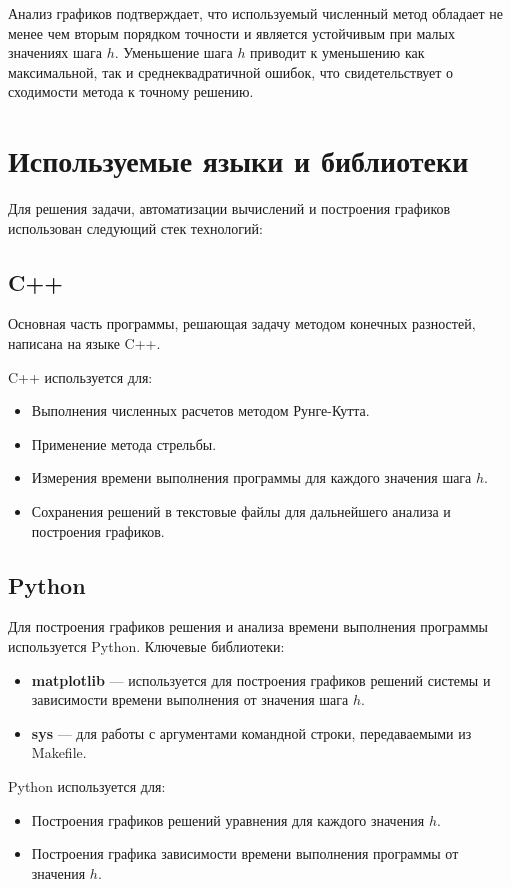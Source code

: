 \documentclass{article}
\begin{document}
Анализ графиков подтверждает, что используемый численный метод обладает не менее чем вторым порядком точности и является устойчивым при малых значениях шага \( h \). Уменьшение шага \( h \) приводит к уменьшению как максимальной, так и среднеквадратичной ошибок, что свидетельствует о сходимости метода к точному решению.


\section{Используемые языки и библиотеки}

Для решения задачи, автоматизации вычислений и построения графиков использован следующий стек технологий:

\subsection{C++}
Основная часть программы, решающая задачу методом конечных разностей, написана на языке C++. 

C++ используется для:
\begin{itemize}
    \item Выполнения численных расчетов методом Рунге-Кутта.
    \item Применение метода стрельбы.
    \item Измерения времени выполнения программы для каждого значения шага \( h \).
    \item Сохранения решений в текстовые файлы для дальнейшего анализа и построения графиков.
\end{itemize}

\subsection{Python}
Для построения графиков решения и анализа времени выполнения программы используется Python. Ключевые библиотеки:
\begin{itemize}
    \item \textbf{matplotlib} — используется для построения графиков решений системы и зависимости времени выполнения от значения шага \( h \).
    \item \textbf{sys} — для работы с аргументами командной строки, передаваемыми из Makefile.
\end{itemize}
Python используется для:
\begin{itemize}
    \item Построения графиков решений уравнения для каждого значения \( h \).
    \item Построения графика зависимости времени выполнения программы от значения \( h \).
\end{itemize}
\end{document}
